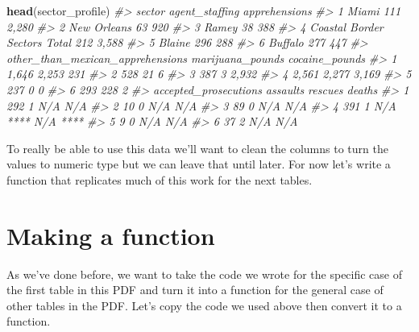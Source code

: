 \documentclass[
  12pt,
]{book}
\newenvironment{Shaded}{\begin{snugshade}}{\end{snugshade}}
\newcommand{\CommentTok}[1]{\textcolor[rgb]{0.56,0.35,0.01}{\textit{#1}}}
\newcommand{\KeywordTok}[1]{\textcolor[rgb]{0.13,0.29,0.53}{\textbf{#1}}}
\newcommand{\NormalTok}[1]{#1}
\begin{document}
\begin{Shaded}
\begin{Highlighting}[]
\KeywordTok{head}\NormalTok{(sector\_profile)}
\CommentTok{\#>                         sector agent\_staffing apprehensions}
\CommentTok{\#> 1                        Miami            111         2,280}
\CommentTok{\#> 2                  New Orleans             63           920}
\CommentTok{\#> 3                        Ramey             38           388}
\CommentTok{\#> 4 Coastal Border Sectors Total            212         3,588}
\CommentTok{\#> 5                       Blaine            296           288}
\CommentTok{\#> 6                      Buffalo            277           447}
\CommentTok{\#>   other\_than\_mexican\_apprehensions marijuana\_pounds cocaine\_pounds}
\CommentTok{\#> 1                            1,646            2,253            231}
\CommentTok{\#> 2                              528               21              6}
\CommentTok{\#> 3                              387                3          2,932}
\CommentTok{\#> 4                            2,561            2,277          3,169}
\CommentTok{\#> 5                              237                0              0}
\CommentTok{\#> 6                              293              228              2}
\CommentTok{\#>   accepted\_prosecutions assaults           rescues deaths}
\CommentTok{\#> 1                   292        1               N/A    N/A}
\CommentTok{\#> 2                    10        0               N/A    N/A}
\CommentTok{\#> 3                    89        0               N/A    N/A}
\CommentTok{\#> 4                   391        1 N/A **** N/A ****       }
\CommentTok{\#> 5                     9        0               N/A    N/A}
\CommentTok{\#> 6                    37        2               N/A    N/A}
\end{Highlighting}
\end{Shaded}

To really be able to use this data we'll want to clean the columns to turn the values to numeric type but we can leave that until later. For now let's write a function that replicates much of this work for the next tables.

\hypertarget{making-a-function}{%
\section{Making a function}\label{making-a-function}}

As we've done before, we want to take the code we wrote for the specific case of the first table in this PDF and turn it into a function for the general case of other tables in the PDF. Let's copy the code we used above then convert it to a function.
\end{document}
